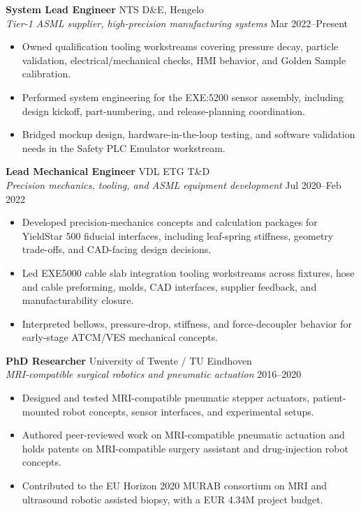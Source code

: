 \documentclass[10pt,a4paper]{article}
\begin{document}
\textbf{System Lead Engineer} \hfill NTS D\&E, Hengelo \\
{\small\textit{Tier-1 ASML supplier, high-precision manufacturing systems}} \hfill {\small Mar 2022--Present}
\begin{itemize}
 \item Owned qualification tooling workstreams covering pressure decay, particle validation, electrical/mechanical checks, HMI behavior, and Golden Sample calibration.
 \item Performed system engineering for the EXE:5200 sensor assembly, including design kickoff, part-numbering, and release-planning coordination.
 \item Bridged mockup design, hardware-in-the-loop testing, and software validation needs in the Safety PLC Emulator workstream.
\end{itemize}

\vspace{4pt}
\textbf{Lead Mechanical Engineer} \hfill VDL ETG T\&D \\
{\small\textit{Precision mechanics, tooling, and ASML equipment development}} \hfill {\small Jul 2020--Feb 2022}
\begin{itemize}
 \item Developed precision-mechanics concepts and calculation packages for YieldStar 500 fiducial interfaces, including leaf-spring stiffness, geometry trade-offs, and CAD-facing design decisions.
 \item Led EXE5000 cable slab integration tooling workstreams across fixtures, hose and cable preforming, molds, CAD interfaces, supplier feedback, and manufacturability closure.
 \item Interpreted bellows, pressure-drop, stiffness, and force-decoupler behavior for early-stage ATCM/VES mechanical concepts.
\end{itemize}

\vspace{4pt}
\textbf{PhD Researcher} \hfill University of Twente / TU Eindhoven \\
{\small\textit{MRI-compatible surgical robotics and pneumatic actuation}} \hfill {\small 2016--2020}
\begin{itemize}
 \item Designed and tested MRI-compatible pneumatic stepper actuators, patient-mounted robot concepts, sensor interfaces, and experimental setups.
 \item Authored peer-reviewed work on MRI-compatible pneumatic actuation and holds patents on MRI-compatible surgery assistant and drug-injection robot concepts.
 \item Contributed to the EU Horizon 2020 MURAB consortium on MRI and ultrasound robotic assisted biopsy, with a EUR 4.34M project budget.
\end{itemize}
\end{document}
